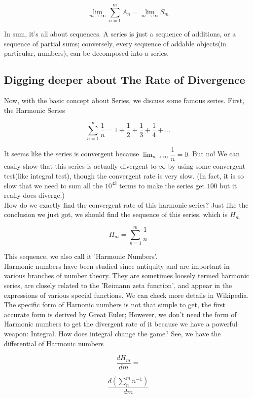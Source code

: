 \documentclass{article}
\begin{document}
  \[
	  \lim_{m \to \infty} \sum_{n=1}^{m} A_n = \lim_{m \to \infty} S_m
  \]

  In sum, it's all about sequences. A series is just a sequence of additions, or a sequence of partial sums; conversely, every sequence of addable objects(in particular, numbers), can be decomposed into a series.

  \subsection{Digging deeper about The Rate of Divergence}
  Now, with the basic concept about Series, we discuss some famous series. First, the Harmonic Series

  \[
	  \sum_{n=1}^{\infty} \dfrac{1}{n} = 1 + \dfrac{1}{2} + \dfrac{1}{3} + \dfrac{1}{4} + ...
  \]

  It seems like the series is convergent because $\displaystyle \lim_{n \to \infty} \dfrac{1}{n} = 0$. But no! We can easily show that this series is actually divergent to $\infty$ by using some convergent test(like integral test), though the convergent rate is very slow. (In fact, it is so slow that we need to sum all the $10^{43}$ terms to make the series get $100$ but it really does diverge.) \\

  How do we exactly find the convergent rate of this harmonic series? Just like the conclusion we just got, we should find the sequence of this series, which is $H_m$ 

  \[
	  H_m = \sum_{n=1}^{m} \dfrac{1}{n}
  \]

  This sequence, we also call it 'Harmonic Numbers'. \\

  Harmonic numbers have been studied since antiquity and are important in various branches of number theory. They are sometimes loosely termed harmonic series, are closely related to the 'Reimann zeta function', and appear in the expressions of various special functions. We can check more details in Wikipedia. The specific form of Harnonic numbers is not that simple to get, the first accurate form is derived by Great Euler; However, we don't need the form of Harmonic numbers to get the divergent rate of it because we have a powerful weapon: Integral. How does integral change the game? See, we have the differential of Harmonic numbers

  \[
	  \dfrac{dH_m}{dm} =
  \]

  \[
	  \dfrac{d \left( \displaystyle \sum_{n}^{m} n^{-1} \right)}{dm}
  \]
\end{document}
